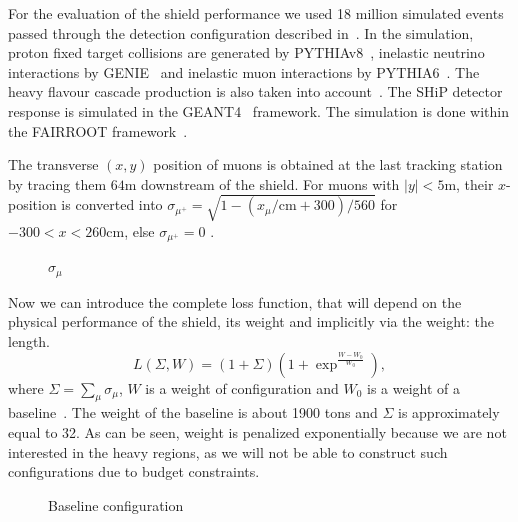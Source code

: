 \documentclass[a4paper]{jpconf}
\theoremstyle{my_theorem_style}
\numberwithin{equation}{section}
\begin{document}
For the evaluation of the shield performance we used 18 million simulated events passed through the detection configuration described in~\cite{Akmete:2017bpl}. In the simulation, proton fixed target collisions are generated by PYTHIAv8~\cite{Pythia8},
inelastic neutrino interactions by GENIE~\cite{Genie} and inelastic muon interactions by PYTHIA6~\cite{Pythia6}. The heavy flavour cascade production is also taken into account~\cite{Cascade}.  The SHiP detector response is simulated in the GEANT4~\cite{Geant4} framework. The simulation is done within the FAIRROOT framework~\cite{FAIRROOT}. 

The transverse $(x,y)$ position of muons is obtained at the last tracking station by tracing them $64\mathrm{m}$ downstream of the shield. For muons with $|y| < 5\mathrm{m}$, their $x$-position is converted into $\sigma_{\mu^+} =  \sqrt{1 - (x_\mu / \mathrm{cm} + 300) / 560}$ for $-300< x < 260\mathrm{cm}$, else $\sigma_{\mu^+} = 0$ \cite{Akmete:2017bpl}.

\begin{figure}[H]
\caption{$\sigma_{\mu}$}
\label{fig:1}
\end{figure}

Now we can introduce the complete loss function, that will depend on the physical performance of the shield, its weight and implicitly via the weight: the length.
\[
L(\Sigma, W) = (1 + \Sigma) (1 + \exp^{\frac{W - W_{0}}{W_{0}}}),
\]
where $\Sigma  = \sum_{\mu} \sigma_{\mu}$, $W$ is a weight of configuration and $W_{0}$ is a weight of a baseline~\cite{Akmete:2017bpl}. The weight of the baseline is about 1900 tons and $\Sigma$ is approximately equal to 32. As can be seen, weight is penalized exponentially because we are not interested in the heavy regions, as we will not be able to construct such configurations due to budget constraints.


\begin{figure}[H]
\caption{Baseline configuration}
\end{figure}
\end{document}
